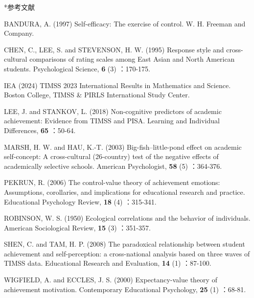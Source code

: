 \documentclass[a4paper,10pt,twocolumn]{ltjsarticle}
\makeatletter
\renewcommand{\section}{\@startsection{section}{1}{\z@}{1.1\Cvs \@plus.4\Cdp \@minus.2\Cdp}{.5\Cvs \@plus.2\Cdp}{\normalfont\gtfamily\bfseries\large}}
\makeatother
\begin{document}
\section*{参考文献}
\begingroup\scriptsize\raggedright{} 
\begin{list}{}{\setlength{\leftmargin}{1.5\zw}\setlength{\itemindent}{-1.5\zw}\setlength{\labelwidth}{0pt}\setlength{\labelsep}{0pt}\setlength{\itemsep}{1pt}\setlength{\parsep}{0pt}\setlength{\topsep}{0pt}\setlength{\listparindent}{0pt}}
\item BANDURA, A. (1997) Self-efficacy: The exercise of control. W. H. Freeman and Company.
\item CHEN, C., LEE, S. and STEVENSON, H. W. (1995) Response style and cross-cultural comparisons of rating scales among East Asian and North American students. Psychological Science, \textbf{6} (3) ：170-175.
\item IEA (2024) TIMSS 2023 International Results in Mathematics and Science. Boston College, TIMSS \& PIRLS International Study Center.
\item LEE, J. and STANKOV, L. (2018) Non-cognitive predictors of academic achievement: Evidence from TIMSS and PISA. Learning and Individual Differences, \textbf{65} ：50-64.
\item MARSH, H. W. and HAU, K.-T. (2003) Big-fish--little-pond effect on academic self-concept: A cross-cultural (26-country) test of the negative effects of academically selective schools. American Psychologist, \textbf{58} (5) ：364-376.
\item PEKRUN, R. (2006) The control-value theory of achievement emotions: Assumptions, corollaries, and implications for educational research and practice. Educational Psychology Review, \textbf{18} (4) ：315-341.
\item ROBINSON, W. S. (1950) Ecological correlations and the behavior of individuals. American Sociological Review, \textbf{15} (3) ：351-357.
\item SHEN, C. and TAM, H. P. (2008) The paradoxical relationship between student achievement and self-perception: a cross-national analysis based on three waves of TIMSS data. Educational Research and Evaluation, \textbf{14} (1) ：87-100.
\item WIGFIELD, A. and ECCLES, J. S. (2000) Expectancy-value theory of achievement motivation. Contemporary Educational Psychology, \textbf{25} (1) ：68-81.
\end{list}\endgroup
\end{document}
